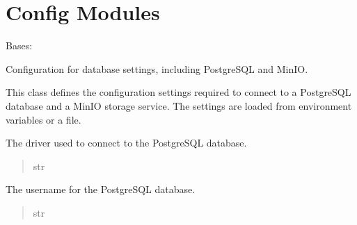 \documentclass[letterpaper,10pt,english]{sphinxmanual}
\begin{document}
\sphinxstepscope


\chapter{Config Modules}
\label{\detokenize{config:config-modules}}\label{\detokenize{config::doc}}

\begin{fulllineitems}
\label{\detokenize{config:config.db.DataBaseSettings}}
\pysigstartsignatures
{}
\pysigstopsignatures
\sphinxAtStartPar
Bases: 

\sphinxAtStartPar
Configuration for database settings, including PostgreSQL and MinIO.

\sphinxAtStartPar
This class defines the configuration settings required to connect to a PostgreSQL database
and a MinIO storage service. The settings are loaded from environment variables or a  file.

\begin{fulllineitems}
\label{\detokenize{config:config.db.DataBaseSettings.POSTGRES_DRIVER}}
\pysigstartsignatures
{}
\pysigstopsignatures
\sphinxAtStartPar
The driver used to connect to the PostgreSQL database.
\begin{quote}\begin{description}
\sphinxAtStartPar
str

\end{description}\end{quote}

\end{fulllineitems}


\begin{fulllineitems}
\label{\detokenize{config:config.db.DataBaseSettings.POSTGRES_USERNAME}}
\pysigstartsignatures
{}
\pysigstopsignatures
\sphinxAtStartPar
The username for the PostgreSQL database.
\begin{quote}\begin{description}
\sphinxAtStartPar
str


\end{description}
\end{quote}
\end{fulllineitems}
\end{fulllineitems}
\end{document}
